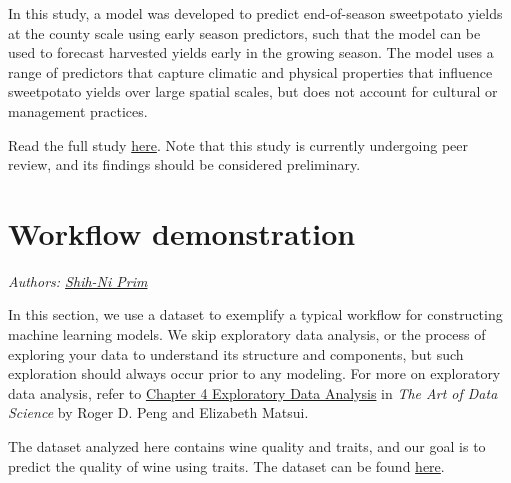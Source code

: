 \documentclass[
]{book}
\newenvironment{Shaded}{\begin{snugshade}}{\end{snugshade}}
\newcommand{\AttributeTok}[1]{\textcolor[rgb]{0.13,0.29,0.53}{#1}}
\newcommand{\ConstantTok}[1]{\textcolor[rgb]{0.56,0.35,0.01}{#1}}
\newcommand{\FunctionTok}[1]{\textcolor[rgb]{0.13,0.29,0.53}{\textbf{#1}}}
\newcommand{\NormalTok}[1]{#1}
\newcommand{\SpecialCharTok}[1]{\textcolor[rgb]{0.81,0.36,0.00}{\textbf{#1}}}
\begin{document}
In this study, a model was developed to predict end-of-season sweetpotato yields at the county scale using early season predictors, such that the model can be used to forecast harvested yields early in the growing season. The model uses a range of predictors that capture climatic and physical properties that influence sweetpotato yields over large spatial scales, but does not account for cultural or management practices.

Read the full study \href{https://doi.org/10.22541/essoar.171415899.94920111/v1}{here}. Note that this study is currently undergoing peer review, and its findings should be considered preliminary.

\hypertarget{workflow}{%
\chapter{Workflow demonstration}\label{workflow}}

\emph{Authors: \href{https://www.linkedin.com/in/shih-ni-prim-14033336/}{Shih-Ni Prim}}

In this section, we use a dataset to exemplify a typical workflow for constructing machine learning models. We skip exploratory data analysis, or the process of exploring your data to understand its structure and components, but such exploration should always occur prior to any modeling. For more on exploratory data analysis, refer to \href{https://bookdown.org/rdpeng/artofdatascience/exploratory-data-analysis.html}{Chapter 4 Exploratory Data Analysis} in \emph{The Art of Data Science} by Roger D. Peng and Elizabeth Matsui.

The dataset analyzed here contains wine quality and traits, and our goal is to predict the quality of wine using traits. The dataset can be found \href{https://www.kaggle.com/datasets/yasserh/wine-quality-dataset}{here}.

\begin{Shaded}
\end{Shaded}
\end{document}
